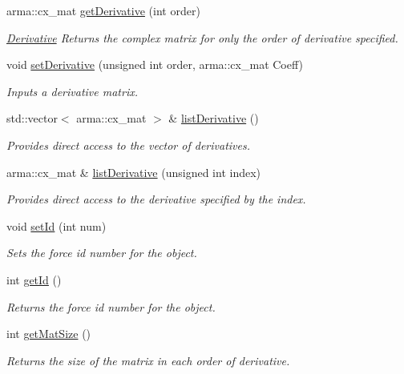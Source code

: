 \begin{DoxyCompactItemize}
arma\-::cx\-\_\-mat \hyperlink{classosea_1_1ofreq_1_1mat_force_react_a916eb8547f09eb3bf67092f0f64ac59c}{get\-Derivative} (int order)
\begin{DoxyCompactList}\small\item\em \hyperlink{classosea_1_1ofreq_1_1_derivative}{Derivative} Returns the complex matrix for only the order of derivative specified. \end{DoxyCompactList}\item 
void \hyperlink{classosea_1_1ofreq_1_1mat_force_react_aab3ce2d56835cfac91cd019f3a7db021}{set\-Derivative} (unsigned int order, arma\-::cx\-\_\-mat Coeff)
\begin{DoxyCompactList}\small\item\em Inputs a derivative matrix. \end{DoxyCompactList}\item 
std\-::vector$<$ arma\-::cx\-\_\-mat $>$ \& \hyperlink{classosea_1_1ofreq_1_1mat_force_react_a52f785374b8e9b6e4d33e0eac95c8622}{list\-Derivative} ()
\begin{DoxyCompactList}\small\item\em Provides direct access to the vector of derivatives. \end{DoxyCompactList}\item 
arma\-::cx\-\_\-mat \& \hyperlink{classosea_1_1ofreq_1_1mat_force_react_af05d5675a035a111264a37472e9ba479}{list\-Derivative} (unsigned int index)
\begin{DoxyCompactList}\small\item\em Provides direct access to the derivative specified by the index. \end{DoxyCompactList}\item 
void \hyperlink{classosea_1_1ofreq_1_1mat_force_react_a778765a5296698179dee923397032756}{set\-Id} (int num)
\begin{DoxyCompactList}\small\item\em Sets the force id number for the object. \end{DoxyCompactList}\item 
int \hyperlink{classosea_1_1ofreq_1_1mat_force_react_ad6416ceeafeb1f1852911fce0536b7f0}{get\-Id} ()
\begin{DoxyCompactList}\small\item\em Returns the force id number for the object. \end{DoxyCompactList}\item 
int \hyperlink{classosea_1_1ofreq_1_1mat_force_react_a9e9d9119e2ca2b49d0faea0897f7e300}{get\-Mat\-Size} ()
\begin{DoxyCompactList}\small\item\em Returns the size of the matrix in each order of derivative. \end{DoxyCompactList}\end{DoxyCompactItemize}
